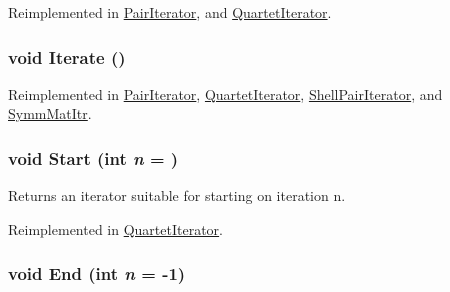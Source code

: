 Reimplemented in \hyperlink{classJKBuilder_1_1PairIterator_ad9163efc0e961126baecc84da6555045}{PairIterator}, and \hyperlink{classJKBuilder_1_1QuartetIterator_a1cc9d53b063e002ead95abb45f05f0c3}{QuartetIterator}.\hypertarget{classJKBuilder_1_1Iterator_a7874a07e98b52f4f147cde6f39353bae}{
\subsubsection[{Iterate}]{\setlength{\rightskip}{0pt plus 5cm}void Iterate ()}}
\label{classJKBuilder_1_1Iterator_a7874a07e98b52f4f147cde6f39353bae}


Reimplemented in \hyperlink{classJKBuilder_1_1PairIterator_a7874a07e98b52f4f147cde6f39353bae}{PairIterator}, \hyperlink{classJKBuilder_1_1QuartetIterator_a7874a07e98b52f4f147cde6f39353bae}{QuartetIterator}, \hyperlink{classJKBuilder_1_1ShellPairIterator_a7874a07e98b52f4f147cde6f39353bae}{ShellPairIterator}, and \hyperlink{classJKBuilder_1_1SymmMatItr_a7874a07e98b52f4f147cde6f39353bae}{SymmMatItr}.\hypertarget{classJKBuilder_1_1Iterator_a34ca36a99b20ae3170babadaffe51ed2}{
\subsubsection[{Start}]{\setlength{\rightskip}{0pt plus 5cm}void Start (int {\em n} = {})}}
\label{classJKBuilder_1_1Iterator_a34ca36a99b20ae3170babadaffe51ed2}


Returns an iterator suitable for starting on iteration n. 

Reimplemented in \hyperlink{classJKBuilder_1_1QuartetIterator_a34ca36a99b20ae3170babadaffe51ed2}{QuartetIterator}.\hypertarget{classJKBuilder_1_1Iterator_a5f692b73d2e160450f4617bb75825e11}{
\subsubsection[{End}]{\setlength{\rightskip}{0pt plus 5cm}void End (int {\em n} = {\ttfamily -\/1})}}
\label{classJKBuilder_1_1Iterator_a5f692b73d2e160450f4617bb75825e11}


